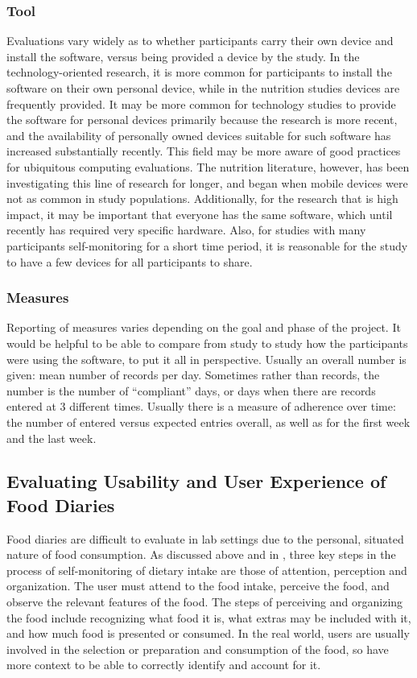 \subsubsection{Tool}
Evaluations vary widely as to whether participants carry their own device and install the software, versus being provided a device by the study. In the technology-oriented research, it is more common for participants to install the software on their own personal device, while in the nutrition studies devices are frequently provided. It may be more common for technology studies to provide the software for personal devices primarily because the research is more recent, and the availability of personally owned devices suitable for such software has increased substantially recently. This field may be more aware of good practices for ubiquitous computing evaluations. The nutrition literature, however, has been investigating this line of research for longer, and began when mobile devices were not as common in study populations. Additionally, for the research that is high impact, it may be important that everyone has the same software, which until recently has required very specific hardware. Also, for studies with many participants self-monitoring for a short time period, it is reasonable for the study to have a few devices for all participants to share. 

\subsubsection{Measures}
Reporting of measures varies depending on the goal and phase of the project. It would be helpful to be able to compare from study to study how the participants were using the software, to put it all in perspective. Usually an overall number is given: mean number of records per day. Sometimes rather than records, the number is the number of ``compliant'' days, or days when there are records entered at 3 different times. Usually there is a measure of adherence over time: the number of entered versus expected entries overall, as well as for the first week and the last week. 

\subsection{Evaluating Usability and User Experience of Food Diaries}

Food diaries are difficult to evaluate in lab settings due to the personal, situated nature of food consumption. As discussed above and in \citep{Baranowski1994}, three key steps in the process of self-monitoring of dietary intake are those of attention, perception and organization. The user must attend to the food intake, perceive the food, and observe the relevant features of the food. The steps of perceiving and organizing the food include recognizing what food it is, what extras may be included with it, and how much food is presented or consumed. In the real world, users are usually involved in the selection or preparation and consumption of the food, so have more context to be able to correctly identify and account for it. 


